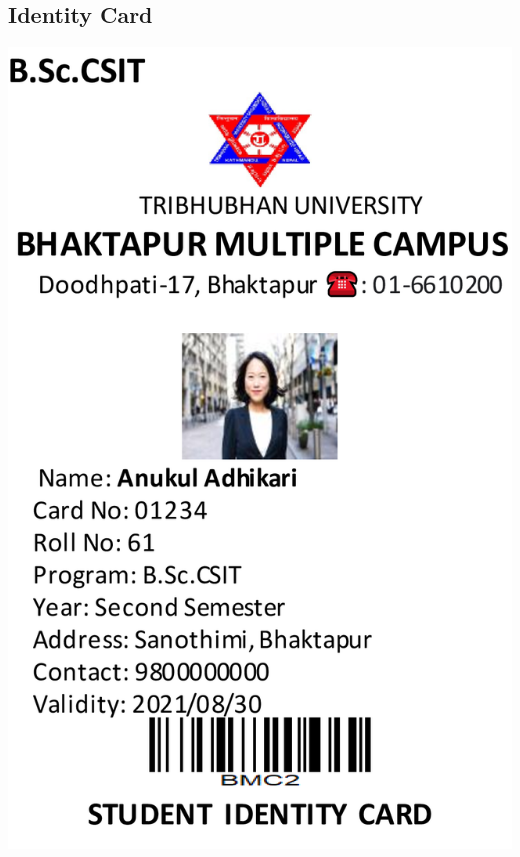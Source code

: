 \documentclass[17pt,a4paper,oneside,margin=1in]{article}
\begin{document}
\subsection{Identity Card}
\includegraphics[width=1\textwidth]{./scrot/id-card.png}
\pagebreak
\end{document}
